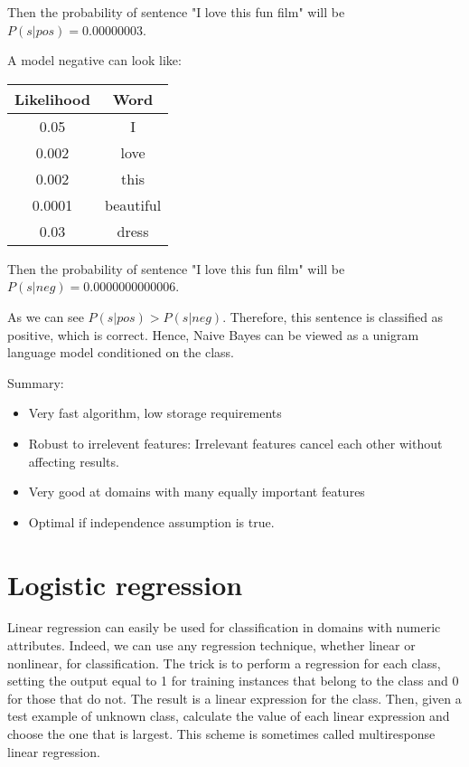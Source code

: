 \documentclass[12pt]{report}
\begin{document}
Then the probability of sentence "I love this fun film" will be $P(s | pos) = 0.00000003$.

A model negative can look like:

\begin{center}
  \begin{tabular}{ c | c }
    \hline
    Likelihood & Word \\ \hline
    0.05 & I \\ \hline
    0.002 & love \\ \hline
    0.002 & this \\ \hline
    0.0001 & beautiful \\ \hline
    0.03 & dress \\ \hline
  \end{tabular}
\end{center}

Then the probability of sentence "I love this fun film" will be $P(s | neg) = 0.0000000000006$.

As we can see $P(s | pos) > P(s | neg)$. Therefore, this sentence is classified as positive, which is correct.
Hence, Naive Bayes can be viewed as a unigram language model conditioned on the class.


Summary:
\begin{itemize}
  \item Very fast algorithm, low storage requirements
  \item Robust to irrelevent features: Irrelevant features cancel each other without affecting results.
  \item Very good at domains with many equally important features
  \item Optimal if independence assumption is true.
\end{itemize}

\newpage

\section{Logistic regression}

Linear regression can easily be used for classification in domains with numeric attributes. Indeed, we can use any regression technique, whether linear or nonlinear, for classification. The trick is to perform a regression for each class, setting the output equal to 1 for training instances that belong to the class and 0 for those that do not. The result is a linear expression for the class. Then, given a test example of unknown class, calculate the value of each linear expression and choose the one that is largest. This scheme is sometimes called multiresponse linear regression.
\end{document}
